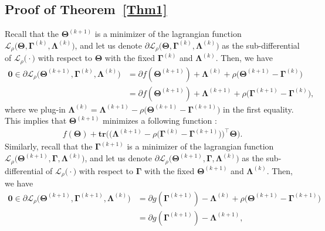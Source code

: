 \documentclass[12pt]{article}
\begin{document}
\subsection{Proof of Theorem~\ref{Thm1}}
Recall that the $\boldsymbol{\Theta}^{(k+1)}$ is a minimizer of the lagrangian function $\mathcal{L}_{\rho}\big(\boldsymbol{\Theta},\boldsymbol{\Gamma}^{(k)},\boldsymbol{\Lambda}^{(k)} \big)$, and let us denote $\partial\mathcal{L}_{\rho}\big(\boldsymbol{\Theta},\boldsymbol{\Gamma}^{(k)},\boldsymbol{\Lambda}^{(k)} \big)$ as the sub-differential of  $\mathcal{L}_{\rho}\big(\cdot\big)$ with respect to $\boldsymbol{\Theta}$ with the fixed $\boldsymbol{\Gamma}^{(k)}$ and $\boldsymbol{\Lambda}^{(k)}$.
Then, we have 
\begin{align*}
    \boldsymbol{0} \in
    \partial\mathcal{L}_{\rho}\big(\boldsymbol{\Theta}^{(k+1)},\boldsymbol{\Gamma}^{(k)},\boldsymbol{\Lambda}^{(k)} \big) 
    &= \partial f(\boldsymbol{\Theta}^{(k+1)}) + \boldsymbol{\Lambda}^{(k)} + \rho\big( \boldsymbol{\Theta}^{(k+1)} - \boldsymbol{\Gamma}^{(k)} \big) \\
    &= \partial f(\boldsymbol{\Theta}^{(k+1)}) + \boldsymbol{\Lambda}^{(k+1)} + \rho\big( \boldsymbol{\Gamma}^{(k+1)} - \boldsymbol{\Gamma}^{(k)} \big),
\end{align*}
where we plug-in $\boldsymbol{\Lambda}^{(k)}=\boldsymbol{\Lambda}^{(k+1)}-\rho\big( \boldsymbol{\Theta}^{(k+1)} - \boldsymbol{\Gamma}^{(k+1)} \big)$ in the first equality.
This implies that $\boldsymbol{\Theta}^{(k+1)}$ minimizes a following function :
\begin{align} \label{f}
    f(\boldsymbol{\Theta}) + \textbf{tr} \big( \big( \boldsymbol{\Lambda}^{(k+1)} - \rho\big( \boldsymbol{\Gamma}^{(k)} - \boldsymbol{\Gamma}^{(k+1)} \big) \big) ^{\top} \boldsymbol{\Theta} \big).
\end{align}
Similarly, recall that the $\boldsymbol{\Gamma}^{(k+1)}$ is a minimizer of the lagrangian function $\mathcal{L}_{\rho}\big(\boldsymbol{\Theta}^{(k+1)},\boldsymbol{\Gamma},\boldsymbol{\Lambda}^{(k)} \big)$, and let us denote $\partial\mathcal{L}_{\rho}\big(\boldsymbol{\Theta}^{(k+1)},\boldsymbol{\Gamma},\boldsymbol{\Lambda}^{(k)}\big)$ as the sub-differential of  $\mathcal{L}_{\rho}\big(\cdot\big)$ with respect to $\boldsymbol{\Gamma}$ with the fixed $\boldsymbol{\Theta}^{(k+1)}$ and $\boldsymbol{\Lambda}^{(k)}$.
Then, we have 
\begin{align*}
    \boldsymbol{0} \in
    \partial\mathcal{L}_{\rho}\big(\boldsymbol{\Theta}^{(k+1)},\boldsymbol{\Gamma}^{(k+1)},\boldsymbol{\Lambda}^{(k)} \big) 
    &= \partial g(\boldsymbol{\Gamma}^{(k+1)}) - \boldsymbol{\Lambda}^{(k)} + \rho\big( \boldsymbol{\Theta}^{(k+1)} - \boldsymbol{\Gamma}^{(k+1)} \big) \\
    &= \partial g(\boldsymbol{\Gamma}^{(k+1)}) - \boldsymbol{\Lambda}^{(k+1)},
\end{align*}
\end{document}
